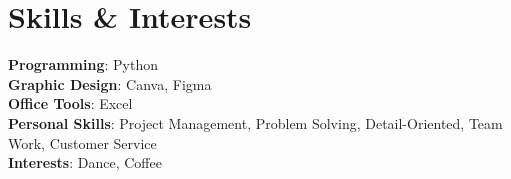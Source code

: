 \documentclass[letterpaper,11pt]{article}
\begin{document}
\section{Skills \& Interests}
 \begin{itemize}[leftmargin=0.15in, label={}]
    \small{\item{
      {\textbf{Programming}}{: Python} \\
      {\textbf{Graphic Design}}{: Canva, Figma} \\
      {\textbf{Office Tools}}{: Excel} \\
      {\textbf{Personal Skills}}{: Project Management, Problem Solving, Detail-Oriented, Team Work, Customer Service} \\
      {\textbf{Interests}}{: Dance, Coffee}
    }}
 \end{itemize}

\end{document}
